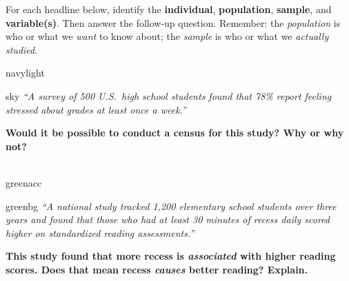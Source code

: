 \documentclass[10pt]{article}
\begin{document}
\namepartnerperiod

\vspace{0.1in}

\begin{tcolorbox}[colback=sky, colframe=navy, boxrule=0.8pt, arc=2mm,
    left=3mm, right=3mm, top=2mm, bottom=2mm]
\small
For each headline below, identify the \textbf{individual}, \textbf{population},
\textbf{sample}, and \textbf{variable(s)}. Then answer the follow-up question.
Remember: the \emph{population} is who or what we \emph{want} to know about;
the \emph{sample} is who or what we \emph{actually studied}.
\end{tcolorbox}

\vspace{0.14in}

\begin{scenariobox}[Scenario 1]{navylight}

\begin{headlinebox}{sky}
\small\textit{``A survey of 500 U.S.\ high school students found that 78\% report
feeling stressed about grades at least once a week.''}
\end{headlinebox}

\vspace{8pt}
\componenttable

\vspace{8pt}
\small\textbf{Would it be possible to conduct a census for this study?
Why or why not?}\\[4pt]
\writeline\\[1pt]\writeline

\end{scenariobox}

\vspace{0.16in}

\begin{scenariobox}[Scenario 2]{greenacc}

\begin{headlinebox}{greenbg}
\small\textit{``A national study tracked 1{,}200 elementary school students over
three years and found that those who had at least 30 minutes of recess daily
scored higher on standardized reading assessments.''}
\end{headlinebox}

\vspace{8pt}
\componenttable

\vspace{8pt}
\small\textbf{This study found that more recess is \emph{associated} with higher
reading scores. Does that mean recess \emph{causes} better reading? Explain.}\\[4pt]
\writeline\\[1pt]\writeline

\end{scenariobox}
\end{document}
